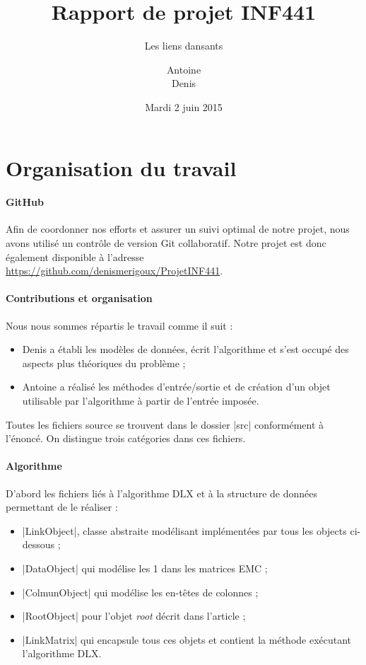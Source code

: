 \documentclass[11pt,french,a4paper]{article}
\title{Rapport de projet INF441}
\subtitle{Les liens dansants}
\author{Antoine \bsc{Berthier}\\ Denis \bsc{Merigoux}}
\date{Mardi 2 juin 2015}
\begin{document}
\maketitle

\section{Organisation du travail}

\paragraph{GitHub} Afin de coordonner nos efforts et assurer un suivi optimal de notre projet, nous avons utilisé un contrôle de version Git collaboratif. Notre projet est donc également disponible à l'adresse \url{https://github.com/denismerigoux/ProjetINF441}.

\paragraph{Contributions et organisation} Nous nous sommes répartis le travail comme il suit :
\begin{itemize}
	\item Denis a établi les modèles de données, écrit l'algorithme et s'est occupé des aspects plus théoriques du problème ;
	\item Antoine a réalisé les méthodes d'entrée/sortie et de création d'un objet utilisable par l'algorithme à partir de l'entrée imposée.
\end{itemize}

Toutes les fichiers source se trouvent dans le dossier |src| conformément à l'énoncé. On distingue trois catégories dans ces fichiers.

\paragraph{Algorithme} D'abord les fichiers liés à l'algorithme DLX et à la structure de données permettant de le réaliser :
\begin{itemize}
	\item |LinkObject|, classe abstraite modélisant implémentées par tous les objects ci-dessous ;
	\item |DataObject| qui modélise les 1 dans les matrices EMC ;
	\item |ColmunObject| qui modélise les en-têtes de colonnes ;
	\item |RootObject| pour l'objet \emph{root} décrit dans l'article ;
	\item |LinkMatrix| qui encapsule tous ces objets et contient la méthode exécutant l'algorithme DLX.
\end{itemize}
\end{document}
